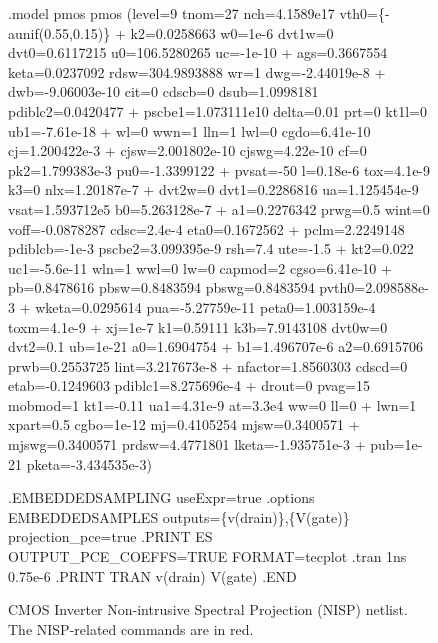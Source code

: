 \begin{figure}[htbp]
\begin{centering}
{\begin{minipage}{0.95\textwidth}
\begin{vquote}
.model pmos pmos (level=9 tnom=27 nch=4.1589e17 \color{red}vth0=\{-aunif(0.55,0.15)\}\color{black} 
+ k2=0.0258663 w0=1e-6 dvt1w=0 dvt0=0.6117215 u0=106.5280265 uc=-1e-10 
+ ags=0.3667554 keta=0.0237092 rdsw=304.9893888 wr=1 dwg=-2.44019e-8 
+ dwb=-9.06003e-10 cit=0 cdscb=0 dsub=1.0998181 pdiblc2=0.0420477 
+ pscbe1=1.073111e10 delta=0.01 prt=0 kt1l=0 ub1=-7.61e-18 
+ wl=0 wwn=1 lln=1 lwl=0 cgdo=6.41e-10 cj=1.200422e-3 
+ cjsw=2.001802e-10 cjswg=4.22e-10 cf=0 pk2=1.799383e-3 pu0=-1.3399122 
+ pvsat=-50 l=0.18e-6 tox=4.1e-9 k3=0 nlx=1.20187e-7 
+ dvt2w=0 dvt1=0.2286816 ua=1.125454e-9 vsat=1.593712e5 b0=5.263128e-7 
+ a1=0.2276342 prwg=0.5 wint=0 voff=-0.0878287 cdsc=2.4e-4 eta0=0.1672562 
+ pclm=2.2249148 pdiblcb=-1e-3 pscbe2=3.099395e-9 rsh=7.4 ute=-1.5 
+ kt2=0.022 uc1=-5.6e-11 wln=1 wwl=0 lw=0 capmod=2 cgso=6.41e-10 
+ pb=0.8478616 pbsw=0.8483594 pbswg=0.8483594 pvth0=2.098588e-3 
+ wketa=0.0295614 pua=-5.27759e-11 peta0=1.003159e-4 toxm=4.1e-9 
+ xj=1e-7 k1=0.59111 k3b=7.9143108 dvt0w=0 dvt2=0.1 ub=1e-21 a0=1.6904754 
+ b1=1.496707e-6 a2=0.6915706 prwb=0.2553725 lint=3.217673e-8 
+ nfactor=1.8560303 cdscd=0 etab=-0.1249603 pdiblc1=8.275696e-4 
+ drout=0 pvag=15 mobmod=1 kt1=-0.11 ua1=4.31e-9 at=3.3e4 ww=0 ll=0 
+ lwn=1 xpart=0.5 cgbo=1e-12 mj=0.4105254 mjsw=0.3400571 
+ mjswg=0.3400571 prdsw=4.4771801 lketa=-1.935751e-3 
+ pub=1e-21 pketa=-3.434535e-3)

\color{red}.EMBEDDEDSAMPLING useExpr=true
.options EMBEDDEDSAMPLES outputs=\{v(drain)\},\{V(gate)\} projection\_pce=true
.PRINT ES OUTPUT\_PCE\_COEFFS=TRUE FORMAT=tecplot \color{black}
.tran 1ns 0.75e-6
.PRINT TRAN v(drain) V(gate)
.END
\end{vquote}
\end{minipage}
}
\caption{CMOS Inverter Non-intrusive Spectral Projection (NISP) netlist. 
 The NISP-related commands are in \color{red}red\color{black}.
\label{NISP_netlist1}}
\end{centering}
\end{figure}

